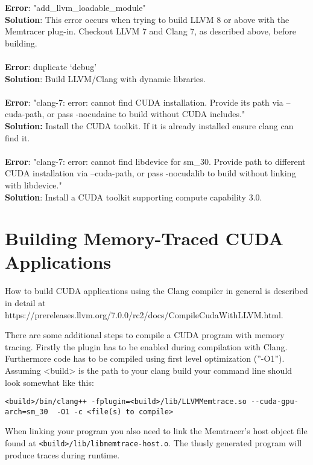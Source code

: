 \documentclass{scrartcl}
\begin{document}
\textbf{Error}: "add\_llvm\_loadable\_module" \\
\textbf{Solution}: This error occurs when trying to build LLVM 8 or above with the Memtracer plug-in. Checkout LLVM 7 and Clang 7, as described above, before building. \\
\\
\textbf{Error}: duplicate ‘debug’ \\
\textbf{Solution}: Build LLVM/Clang with dynamic libraries. \\
\\
\textbf{Error}: "clang-7: error: cannot find CUDA installation.  Provide its path via --cuda-path, or pass -nocudainc to build without CUDA includes." \\
\textbf{Solution:} Install the CUDA toolkit. If it is already installed ensure clang can find it. \\
\\
\textbf{Error}: "clang-7: error: cannot find libdevice for sm\_30. Provide path to different CUDA installation via --cuda-path, or pass -nocudalib to build without linking with libdevice." \\
\textbf{Solution}: Install a CUDA toolkit supporting compute capability 3.0.

\section{Building Memory-Traced CUDA Applications}

How to build CUDA applications using the Clang compiler in general is described in detail at https://prereleases.llvm.org/7.0.0/rc2/docs/CompileCudaWithLLVM.html.

There are some additional steps to compile a CUDA program with memory tracing. Firstly the plugin has to be enabled during compilation with Clang. Furthermore code has to be compiled using first level optimization (”-O1”).
Assuming <build> is the path to your clang build your command line should look somewhat like this:

\begin{lstlisting}[language=myLang]
<build>/bin/clang++ -fplugin=<build>/lib/LLVMMemtrace.so --cuda-gpu-arch=sm_30  -O1 -c <file(s) to compile>
\end{lstlisting}


When linking your program you also need to link the Memtracer’s host object file found at \lstinline{<build>/lib/libmemtrace-host.o}.
The thusly generated program will produce traces during runtime.
\end{document}
